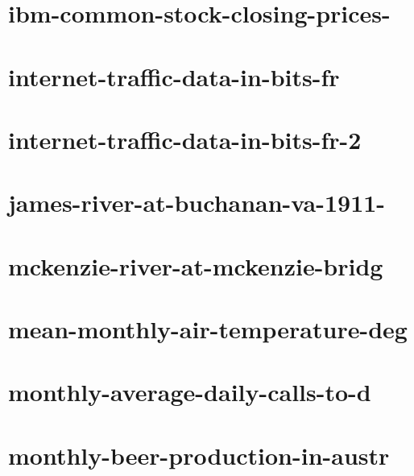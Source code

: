 \documentclass[twoside]{article}
\begin{document}
    

\section{ibm-common-stock-closing-prices-}

    

\section{internet-traffic-data-in-bits-fr}

    

\section{internet-traffic-data-in-bits-fr-2}

    

\section{james-river-at-buchanan-va-1911-}

    

\section{mckenzie-river-at-mckenzie-bridg}

    

\section{mean-monthly-air-temperature-deg}

    

\section{monthly-average-daily-calls-to-d}

    

\section{monthly-beer-production-in-austr}
\end{document}
